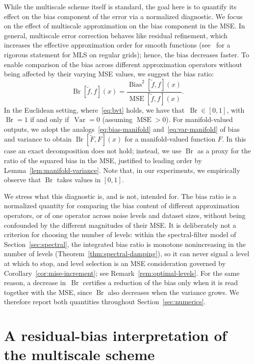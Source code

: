 \documentclass[12pt]{article}
\DeclareMathOperator{\br}{Br}
\DeclareMathOperator{\mse}{MSE}
\newcommand{\bias}{\operatorname{Bias}^2}
\DeclareMathOperator{\var}{Var}
\begin{document}
While the multiscale scheme itself is standard, the goal here is to quantify its effect on the bias component of the error via a normalized diagnostic. We focus on the effect of multiscale approximation on the bias component in the MSE. In general, multiscale error correction behaves like residual refinement, which increases the effective approximation order for smooth functions (see~\cite{durst2026improved} for a rigorous statement for MLS on regular grids); hence, the bias decreases faster. To enable comparison of the bias across different approximation operators without being affected by their varying MSE values, we suggest the bias ratio:
\begin{equation}\label{eq:bias-ratio}
    \br[\widetilde{f},f](x) = \frac{\bias[\widetilde{f},f](x)} {\mse[\widetilde{f},f](x)}.
\end{equation}
In the Euclidean setting, where~\eqref{eq:bvt} holds, we have that~$\br\in[0,1]$, with~$\br=1$ if and only if~$\var=0$ (assuming $\mse>0$). For manifold-valued outputs, we adopt the analogs~\eqref{eq:bias-manifold} and~\eqref{eq:var-manifold} of bias and variance to obtain $\br[\widetilde{F}, F](x)$ for a manifold-valued function $F$. In this case an exact decomposition does not hold; instead, we use $\br$ as a proxy for the ratio of the squared bias in the MSE, justified to leading order by Lemma~\ref{lem:manifold-variance}. Note that, in our experiments, we empirically observe that $\br$ takes values in $[0,1]$.

We stress what this diagnostic is, and is not, intended for. The bias ratio is a normalized quantity for comparing the bias content of different approximation operators, or of one operator across noise levels and dataset sizes, without being confounded by the different magnitudes of their MSE. It is deliberately not a criterion for choosing the number of levels: within the spectral-filter model of Section~\ref{sec:spectral}, the integrated bias ratio is monotone nonincreasing in the number of levels (Theorem~\ref{thm:spectral-damping}), so it can never signal a level at which to stop, and level selection is an MSE consideration governed by Corollary~\ref{cor:mise-increment}; see Remark~\ref{rem:optimal-levels}. For the same reason, a decrease in~$\br$ certifies a reduction of the bias only when it is read together with the MSE, since $\br$ also decreases when the variance grows. We therefore report both quantities throughout Section~\ref{sec:numerics}.

\section{A residual-bias interpretation of the multiscale scheme}\label{sec:residual-bias}
\end{document}
